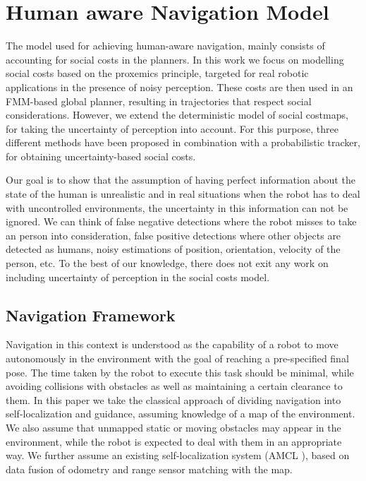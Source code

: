 \section{Human aware Navigation Model}



The model used for achieving human-aware navigation, mainly consists of accounting for social costs in the planners. In this work we focus on modelling social costs based on the proxemics principle, targeted for real robotic applications in the presence of noisy perception. These costs are then used in an FMM-based global planner, resulting in trajectories that respect social considerations. However, we extend the deterministic model of social costmaps, for taking the uncertainty of perception into account. For this purpose, three different methods have been proposed in combination with a probabilistic tracker, for obtaining uncertainty-based social costs. 

Our goal is to show that the assumption of having perfect information about the state of the human is unrealistic and in real situations when the robot has to deal with uncontrolled environments, the uncertainty in this information can not be ignored. We can think of false negative detections where the robot misses to take an person into consideration, false positive detections where other objects are detected as humans, noisy estimations of position, orientation, velocity of the person, etc. To the best of our knowledge, there does not exit any work on including uncertainty of perception in the social costs model.

\subsection{Navigation Framework}

Navigation in this context is understood as the capability of a robot to move autonomously in the environment with the goal of reaching a pre-specified final pose. The time taken by the robot to execute this task should be minimal, while avoiding collisions with obstacles as well as maintaining a certain clearance to them. In this paper we take the classical approach of dividing navigation into self-localization and guidance, assuming knowledge of a map of the environment. We also assume that unmapped static or moving obstacles may appear in the environment, while the robot is expected to deal with them in an appropriate way. We further assume an existing self-localization system (AMCL \cite{amcl}), based on data fusion of odometry and range sensor matching with the map. 

